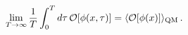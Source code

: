 \begin{equation}
\lim_{T\to\infty} \frac{1}{T} \int_0^T d\tau\, {\cal O}[\phi(x,\tau)]
= \langle {\cal O}[\phi(x)] \rangle_\mathrm{QM} \, .
\label{eq5}
\end{equation}

